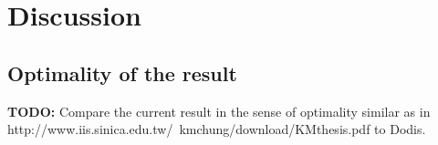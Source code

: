 \documentclass[11pt,a4paper,titlepage]{memoir}
\begin{document}
\section{Discussion}
\subsection{Optimality of the result}
\begin{todo}
  \textbf{TODO:} Compare the current result in the sense of optimality similar as in
  http://www.iis.sinica.edu.tw/~kmchung/download/KMthesis.pdf to Dodis.
\end{todo}
%
%
\appendix


\backmatter



\end{document}
